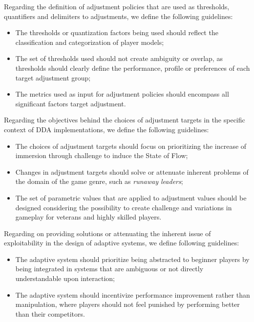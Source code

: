 Regarding the definition of adjustment policies that are used as thresholds, quantifiers and delimiters to adjustments, we define the following guidelines:
\begin{itemize}
    \item{The thresholds or quantization factors being used should reflect the classification and categorization of player models;}
    \item{The set of thresholds used should not create ambiguity or overlap, as thresholds should clearly define the performance, profile or preferences of each target adjustment group;}
    \item{The metrics used as input for adjustment policies should encompass all significant factors target adjustment.}
\end{itemize}

Regarding the objectives behind the choices of adjustment targets in the specific context of DDA implementations, we define the following guidelines:
\begin{itemize}
    \item{The choices of adjustment targets should focus on prioritizing the increase of immersion through challenge to induce the State of Flow;}
    \item{Changes in adjustment targets should solve or attenuate inherent problems of the domain of the game genre, such as \emph{runaway leaders};}
    \item{The set of parametric values that are applied to adjustment values should be designed considering the possibility to create challenge and variations in gameplay for veterans and highly skilled players.}
\end{itemize}

Regarding on providing solutions or attenuating the inherent issue of exploitability in the design of adaptive systems, we define following guidelines:
\begin{itemize}
    \item{The adaptive system should prioritize being abstracted to beginner players by being integrated in systems that are ambiguous or not directly understandable upon interaction;}
    \item{The adaptive system should incentivize performance improvement rather than manipulation, where players should not feel punished by performing better than their competitors.}
\end{itemize}

